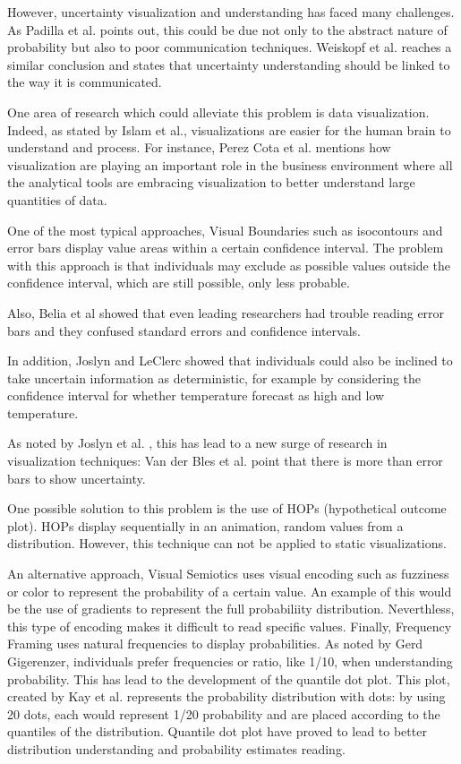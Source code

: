 \documentclass[a4paper,3p,sort&compress]{elsarticle}
\begin{document}
However, uncertainty visualization and understanding has faced many challenges. As Padilla et al. \cite{balakrishnan_uncertainty_2021} 
points out, this could be due not only to the abstract nature of probability 
but also to poor communication techniques. Weiskopf et al. reaches a similar conclusion and states 
that uncertainty understanding should be linked to the way it is communicated. 

One area of research which could alleviate this problem is data visualization. Indeed, as 
stated by Islam et al., visualizations are easier for the human brain to understand and process.
For instance, Perez Cota et al. mentions how visualization are playing an important role in the business 
environment where all the analytical tools are embracing visualization to better understand large quantities of data. 

One of the most typical approaches, Visual Boundaries such as isocontours and error 
bars display value areas within a certain confidence interval. The problem with this approach is 
that individuals may exclude as possible values outside the confidence interval, which are still 
possible, only less probable. 

Also, Belia et al \cite{belia_researchers_2005} showed that even leading researchers had 
trouble reading error bars and they confused 
standard errors and confidence intervals. 

In addition, Joslyn and LeClerc showed that individuals could also be inclined to take uncertain 
information as deterministic, for example by considering the confidence interval for whether temperature 
forecast as high and low temperature. 

As noted by Joslyn et al. \cite{joslyn_communicating_2010}, this has lead to a new surge of 
research in visualization techniques: Van 
der Bles et al. \cite{van_der_bles_communicating_nodate} point that there is more than 
error bars to show uncertainty. 

One possible solution to this problem is the use of HOPs (hypothetical outcome plot). HOPs display 
sequentially in an animation, random values from a distribution. However, this technique can not be 
applied to static visualizations. 

An alternative approach, Visual Semiotics uses visual encoding such as fuzziness or color to represent 
the probability of a certain value. An example of this would be the use of gradients to represent the 
full probabiliity distribution. Neverthless, this type of encoding makes it difficult to read specific 
values. Finally, Frequency Framing uses natural frequencies to display probabilities. As noted by Gerd 
Gigerenzer, individuals prefer frequencies or ratio, like 1/10, when understanding probability. This has 
lead to the development of the quantile dot plot. This plot, created by Kay et al. 
\cite{2016-when-ish-is-my-bus} 
represents 
the probability distribution with dots: by using 20 dots, each would represent 1/20 probability 
and are placed according 
to the quantiles of the distribution. Quantile dot plot have proved to lead to better distribution 
understanding and probability estimates reading. 
\end{document}
